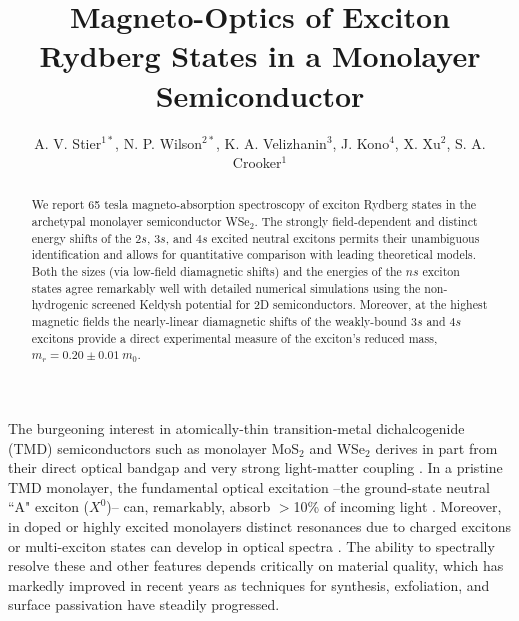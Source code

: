 \documentclass[aps,prl,twocolumn]{revtex4-1}
\begin{document}
\preprint{}

\title{Magneto-Optics of Exciton Rydberg States in a Monolayer Semiconductor}

\author{A. V. Stier$^{1*}$, N. P. Wilson$^{2*}$, K. A. Velizhanin$^{3}$, J. Kono$^{4}$, X. Xu$^2$, S. A. Crooker$^1$}


\begin{abstract}
We report 65 tesla magneto-absorption spectroscopy of exciton Rydberg states in the archetypal monolayer semiconductor WSe$_2$. The strongly field-dependent and distinct energy shifts of the $2s$, $3s$, and $4s$ excited neutral excitons permits their unambiguous identification and allows for quantitative comparison with leading theoretical models. Both the sizes (via low-field diamagnetic shifts) and the energies of the $ns$ exciton states agree remarkably well with detailed numerical simulations using the non-hydrogenic screened Keldysh potential for 2D semiconductors. Moreover, at the highest magnetic fields the nearly-linear diamagnetic shifts of the weakly-bound $3s$ and $4s$ excitons provide a direct experimental measure of the exciton's reduced mass, $m_r = 0.20 \pm 0.01~m_0$.
\end{abstract}

\maketitle

The burgeoning interest in atomically-thin transition-metal dichalcogenide (TMD) semiconductors such as monolayer MoS$_2$ and WSe$_2$ derives in part from their direct optical bandgap and very strong light-matter coupling \cite{MakShan, XuReview}. In a pristine TMD monolayer, the fundamental optical excitation --the ground-state neutral ``A" exciton ($X^0$)-- can, remarkably, absorb $>$10\% of incoming light \cite{Li}. Moreover, in doped or highly excited monolayers distinct resonances due to charged excitons or multi-exciton states can develop in optical spectra \cite{Ross, ZWang1, Courtade, You, Falko, Hao}. The ability to spectrally resolve these and other features depends critically on material quality, which has markedly improved in recent years as techniques for synthesis, exfoliation, and surface passivation have steadily progressed.
\end{document}
